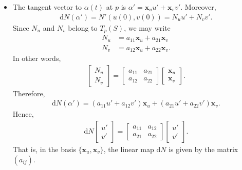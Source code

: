 \documentclass[10pt]{article}
\newcommand{\dee}{\mathrm{d}}
\newcommand{\ve}[1]{\mathbf{#1}}
\begin{document}
\begin{itemize}
    \item The tangent vector to $\alpha(t)$ at $p$ is $\alpha' = \ve{x}_u u' + \ve{x}_v v'$. Moreover,
    \begin{align*}
      \dee N(\alpha') = N'(u(0), v(0)) = N_u u' + N_v v'.
    \end{align*}
    Since $N_u$ and $N_v$ belong to $T_p(S)$, we may write
    \begin{align*}
      N_u &= a_{11} \ve{x}_u + a_{21} \ve{x}_v\\
      N_v &= a_{12} \ve{x}_u + a_{22} \ve{x}_v.
    \end{align*}
    In other words,
    \begin{align*}
      \begin{bmatrix}
        N_u \\
        N_v
      \end{bmatrix}
      =
      \begin{bmatrix}
        a_{11} & a_{21}\\
        a_{12} & a_{22}
      \end{bmatrix}
      \begin{bmatrix}
        \ve{x}_u\\
        \ve{x}_v
      \end{bmatrix}.
    \end{align*}
    Therefore,
    \begin{align*}
      \dee N(\alpha') = (a_{11}u' + a_{12}v')\ve{x}_u + (a_{21}u' + a_{22}v')\ve{x}_v.
    \end{align*}
    Hence,
    \begin{align*}
      \dee N \begin{bmatrix}
        u'\\
        v'
      \end{bmatrix}
      =
      \begin{bmatrix}
        a_{11} & a_{12}\\
        a_{21} & a_{22}
      \end{bmatrix}
      \begin{bmatrix}
        u'\\
        v'
      \end{bmatrix}.
    \end{align*}
    That is, in the basis $\{ \ve{x}_u, \ve{x}_v \}$, the linear map $\dee N$ is given by the matrix $(a_{ij})$.


\end{itemize}
\end{document}
